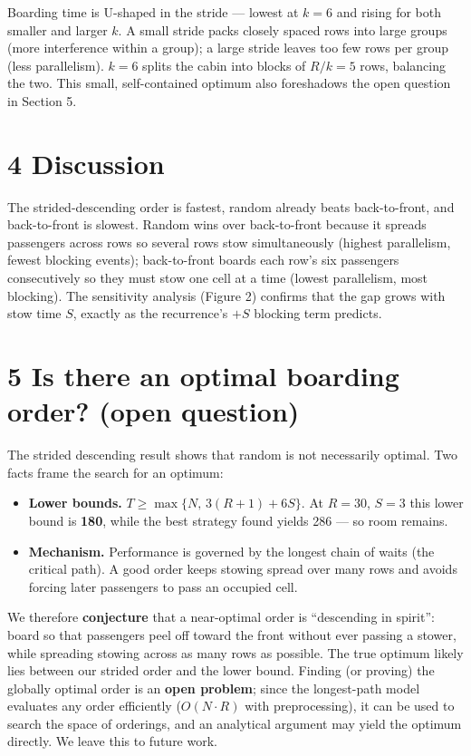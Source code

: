 \documentclass[
  11pt,
  a4paper]{article}
\providecommand{\tightlist}{%
  \setlength{\itemsep}{0pt}\setlength{\parskip}{0pt}}
\begin{document}
Boarding time is U-shaped in the stride --- lowest at \(k=6\) and rising
for both smaller and larger \(k\). A small stride packs closely spaced
rows into large groups (more interference within a group); a large
stride leaves too few rows per group (less parallelism). \(k=6\) splits
the cabin into blocks of \(R/k=5\) rows, balancing the two. This small,
self-contained optimum also foreshadows the open question in Section 5.

\section{4 Discussion}\label{discussion}

The strided-descending order is fastest, random already beats
back-to-front, and back-to-front is slowest. Random wins over
back-to-front because it spreads passengers across rows so several rows
stow simultaneously (highest parallelism, fewest blocking events);
back-to-front boards each row's six passengers consecutively so they
must stow one cell at a time (lowest parallelism, most blocking). The
sensitivity analysis (Figure 2) confirms that the gap grows with stow
time \(S\), exactly as the recurrence's \(+S\) blocking term predicts.

\section{5 Is there an optimal boarding order? (open
question)}\label{is-there-an-optimal-boarding-order-open-question}

The strided descending result shows that random is not necessarily
optimal. Two facts frame the search for an optimum:

\begin{itemize}
\tightlist
\item
  \textbf{Lower bounds.} \(T\ge\max\{N,\,3(R+1)+6S\}\). At \(R=30\),
  \(S=3\) this lower bound is \textbf{180}, while the best strategy
  found yields 286 --- so room remains.
\item
  \textbf{Mechanism.} Performance is governed by the longest chain of
  waits (the critical path). A good order keeps stowing spread over many
  rows and avoids forcing later passengers to pass an occupied cell.
\end{itemize}

We therefore \textbf{conjecture} that a near-optimal order is
``descending in spirit'': board so that passengers peel off toward the
front without ever passing a stower, while spreading stowing across as
many rows as possible. The true optimum likely lies between our strided
order and the lower bound. Finding (or proving) the globally optimal
order is an \textbf{open problem}; since the longest-path model
evaluates any order efficiently (\(O(N\cdot R)\) with preprocessing), it
can be used to search the space of orderings, and an analytical argument
may yield the optimum directly. We leave this to future work.
\end{document}

